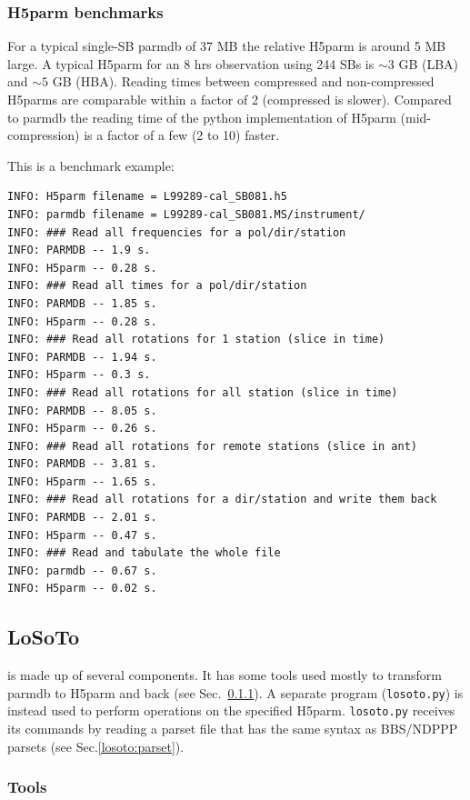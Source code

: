 \documentclass[]{article}
\begin{document}
\subsubsection{H5parm benchmarks}

For a typical single-SB parmdb of 37 MB the relative H5parm is around 5 MB large. A typical H5parm for an 8 hrs observation using 244 SBs is $\sim 3$ GB (LBA) and $\sim 5$ GB (HBA). Reading times between compressed and non-compressed H5parms are comparable within a factor of 2 (compressed is slower). Compared to parmdb the reading time of the python implementation of H5parm (mid-compression) is a factor of a few (2 to 10) faster.

This is a benchmark example:

\begin{verbatim}
INFO: H5parm filename = L99289-cal_SB081.h5
INFO: parmdb filename = L99289-cal_SB081.MS/instrument/
INFO: ### Read all frequencies for a pol/dir/station
INFO: PARMDB -- 1.9 s.
INFO: H5parm -- 0.28 s.
INFO: ### Read all times for a pol/dir/station
INFO: PARMDB -- 1.85 s.
INFO: H5parm -- 0.28 s.
INFO: ### Read all rotations for 1 station (slice in time)
INFO: PARMDB -- 1.94 s.
INFO: H5parm -- 0.3 s.
INFO: ### Read all rotations for all station (slice in time)
INFO: PARMDB -- 8.05 s.
INFO: H5parm -- 0.26 s.
INFO: ### Read all rotations for remote stations (slice in ant)
INFO: PARMDB -- 3.81 s.
INFO: H5parm -- 1.65 s.
INFO: ### Read all rotations for a dir/station and write them back
INFO: PARMDB -- 2.01 s.
INFO: H5parm -- 0.47 s.
INFO: ### Read and tabulate the whole file
INFO: parmdb -- 0.67 s.
INFO: H5parm -- 0.02 s.
\end{verbatim}

\subsection{LoSoTo}
\label{losoto:overview}

\losoto{} is made up of several components. It has some tools used mostly to transform parmdb to H5parm and back (see Sec.~\ref{losoto:tools}). A separate program (\texttt{losoto.py}) is instead used to perform operations on the specified H5parm. \texttt{losoto.py} receives its commands by reading a parset file that has the same syntax as BBS/NDPPP parsets (see Sec.\ref{losoto:parset}).

\subsubsection{Tools}
\label{losoto:tools}
\end{document}
